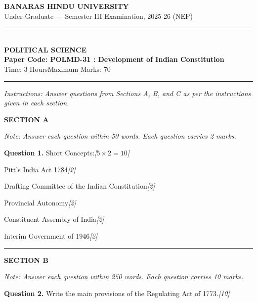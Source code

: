 \documentclass[11pt,a4paper]{article}
\newcommand{\pts}[1]{\hfill   \textit{[#1]}}
\begin{document}
\begin{center}
  {\large\bfseries BANARAS HINDU UNIVERSITY}\\[2pt]
  {\normalsize Under Graduate --- Semester III Examination, 2025-26 (NEP)}\\[6pt]
  \rule{0.8\linewidth}{0.5pt}\\[6pt]
  {\large\bfseries POLITICAL SCIENCE}\\[4pt]
  {\large\bfseries Paper Code: POLMD-31 : Development of Indian Constitution}\\[4pt]
  {\normalsize Time: 3 Hours\hfill Maximum Marks: 70}
\end{center}

\rule{\linewidth}{0.4pt}

\smallskip



\noindent   \textit{Instructions: Answer questions from Sections A, B, and C as per the instructions given in each section.}

\bigskip

\centerline{   \textbf{SECTION A}}
\smallskip



\noindent   \textit{Note: Answer each question within 50 words. Each question carries 2 marks.}

\bigskip




\noindent   \textbf{Question 1.} Short Concepts:\pts{$5  \times 2 = 10$}

\begin{parts}
  \item Pitt's India Act 1784\pts{2}
  \item Drafting Committee of the Indian Constitution\pts{2}
  \item Provincial Autonomy\pts{2}
  \item Constituent Assembly of India\pts{2}
  \item Interim Government of 1946\pts{2}
\end{parts}

\bigskip
\rule{\linewidth}{0.2pt}
\medskip

\centerline{   \textbf{SECTION B}}
\smallskip



\noindent   \textit{Note: Answer each question within 250 words. Each question carries 10 marks.}

\bigskip




\noindent   \textbf{Question 2.} Write the main provisions of the Regulating Act of 1773.\pts{10}
\end{document}
